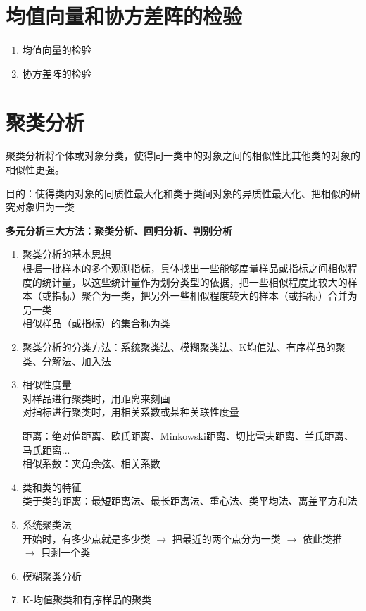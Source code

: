 \documentclass[UTF8,10pt]{book}
\begin{document}
\section{均值向量和协方差阵的检验}\label{header-n25}

\begin{enumerate}
	\def\labelenumi{\arabic{enumi}.}
	\item
	均值向量的检验
	\item
	协方差阵的检验
\end{enumerate}

\section{聚类分析}\label{header-n32}

聚类分析将个体或对象分类，使得同一类中的对象之间的相似性比其他类的对象的相似性更强。

目的：使得类内对象的同质性最大化和类于类间对象的异质性最大化、把相似的研究对象归为一类

\textbf{多元分析三大方法：聚类分析、回归分析、判别分析}

\begin{enumerate}
	\def\labelenumi{\arabic{enumi}.}
	\item
	聚类分析的基本思想\\
	根据一批样本的多个观测指标，具体找出一些能够度量样品或指标之间相似程度的统计量，以这些统计量作为划分类型的依据，把一些相似程度比较大的样本（或指标）聚合为一类，把另外一些相似程度较大的样本（或指标）合并为另一类\\
	相似样品（或指标）的集合称为类
	\item
	聚类分析的分类方法：系统聚类法、模糊聚类法、K均值法、有序样品的聚类、分解法、加入法
	\item
	相似性度量\\
	对样品进行聚类时，用距离来刻画\\
	对指标进行聚类时，用相关系数或某种关联性度量
	
	距离：绝对值距离、欧氏距离、Minkowski距离、切比雪夫距离、兰氏距离、马氏距离...\\
	相似系数：夹角余弦、相关系数
	\item
	类和类的特征\\
	类于类的距离：最短距离法、最长距离法、重心法、类平均法、离差平方和法
	\item
	系统聚类法\\
	开始时，有多少点就是多少类 \(\rightarrow\) 把最近的两个点分为一类
	\(\rightarrow\) 依此类推 \(\rightarrow\) 只剩一个类
	\item
	模糊聚类分析
	\item
	K-均值聚类和有序样品的聚类
\end{enumerate}
\end{document}
